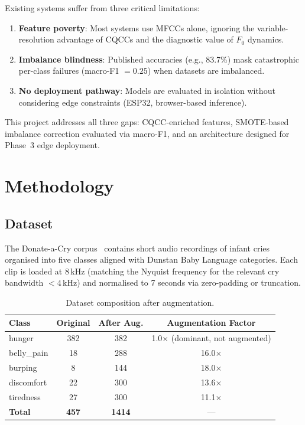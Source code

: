 \documentclass[11pt,a4paper]{article}
\begin{document}
Existing systems suffer from three critical limitations:
\begin{enumerate}[nosep]
  \item \textbf{Feature poverty}: Most systems use MFCCs alone,
        ignoring the variable-resolution advantage of CQCCs and the
        diagnostic value of $F_0$ dynamics.
  \item \textbf{Imbalance blindness}: Published accuracies
        (e.g., 83.7\%) mask catastrophic per-class failures
        (macro-F1 $= 0.25$) when datasets are imbalanced.
  \item \textbf{No deployment pathway}: Models are evaluated in
        isolation without considering edge constraints (ESP32,
        browser-based inference).
\end{enumerate}

\noindent
This project addresses all three gaps: CQCC-enriched features,
SMOTE-based imbalance correction evaluated via macro-F1, and an
architecture designed for Phase~3 edge deployment.

\section{Methodology}
\label{sec:methods}

\subsection{Dataset}

The Donate-a-Cry corpus~\cite{donateacry} contains short audio
recordings of infant cries organised into five classes aligned with
Dunstan Baby Language categories. Each clip is loaded at 8\,kHz
(matching the Nyquist frequency for the relevant cry bandwidth
$< 4$\,kHz) and normalised to 7 seconds via zero-padding or truncation.

\begin{table}[H]
\centering
\caption{Dataset composition after augmentation.}
\label{tab:class_dist}
\begin{tabular}{lccc}
\toprule
\textbf{Class} & \textbf{Original} & \textbf{After Aug.} & \textbf{Augmentation Factor} \\
\midrule
hunger      & 382 & 382 & 1.0$\times$ (dominant, not augmented) \\
belly\_pain & 18  & 288 & 16.0$\times$ \\
burping     & 8   & 144 & 18.0$\times$ \\
discomfort  & 22  & 300 & 13.6$\times$ \\
tiredness   & 27  & 300 & 11.1$\times$ \\
\midrule
\textbf{Total} & \textbf{457} & \textbf{1414} & --- \\
\bottomrule
\end{tabular}
\end{table}
\end{document}
